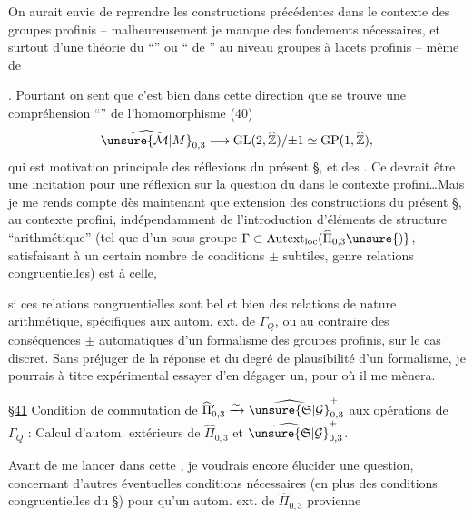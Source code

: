 On aurait envie de reprendre les
constructions précédentes dans le contexte
des groupes profinis -- malheureusement
je manque des fondements nécessaires,
et surtout d'une théorie du ``''
ou `` de '' au niveau groupes
à lacets profinis -- même de   

. Pourtant on sent que c'est
bien dans cette direction que se trouve
une compréhension ``''
de l'homomorphisme  (40)
\[
\widehat{\unsure{\mathcal M|M}}_{0,3}\longrightarrow
\mathrm{GL}(2,\widehat{\mathbb Z})/\mathord{\pm}1
\simeq\mathrm{GP}(1,\widehat{\mathbb Z}),
\]
qui est  motivation principale des
réflexions du présent \S, et des .
Ce devrait être une incitation pour une
réflexion  sur la question du
 dans le contexte profini\ldots Mais
je me rends compte dès maintenant
que   extension des constructions du
présent \S, au contexte profini, indépendamment
de l'introduction d'éléments
de structure ``arithmétique'' (tel que
 \uline{} d'un sous-groupe
$\Gamma\subset\mathrm{Autext}_{\mathrm{loc}}(\widehat{\Pi}_{0,3}\unsure{)}$,
satisfaisant à un certain nombre de
conditions $\pm$ subtiles, genre relations
congruentielles) est  à celle,


si ces relations congruentielles sont bel et
bien des relations de nature arithmétique,
spécifiques aux autom. ext. 
de $\Gamma_Q$, ou au contraire des
conséquences $\pm$ automatiques d'un
formalisme  des groupes profinis,  
sur le cas discret. Sans préjuger 
de la réponse et du degré de
plausibilité d'un  formalisme, je
pourrais à titre expérimental essayer
d'en dégager un, pour  où il
me mènera.

\uline{\S 41} Condition de commutation de
$\widehat{\Pi}'_{0,3}\xrightarrow{\sim}\widehat{\unsure{\mathfrak S|\mathcal G}}_{0,3}^{+}$
aux opérations de $\Gamma_Q$ : Calcul d'autom.
extérieurs de $\widehat{\Pi}_{0,3}$ et $\widehat{\unsure{\mathfrak S|\mathcal G}}_{0,3}^{+}$.

Avant de me lancer dans cette
, je voudrais encore élucider
une question, concernant d'autres
éventuelles conditions nécessaires (en plus
des conditions congruentielles du \S{})
pour qu'un autom. ext. de $\widehat{\Pi}_{0,3}$ provienne

